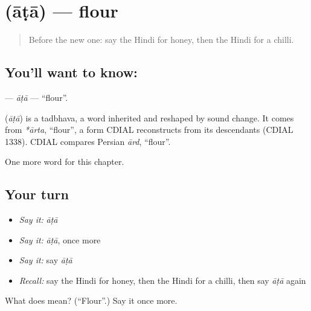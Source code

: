 \section[\texorpdfstring{\hi{आटा} (āṭā)}{आटा (āṭā)}]{ (āṭā) — flour}

\label{lesson:HI-C141-ata}



\begin{quote}
Before the new one: say the Hindi for honey, then the Hindi for a chilli.
\end{quote}

\subsection*{You'll want to know: }
\textbf{} — \emph{āṭā} — \textquotedblleft{}flour\textquotedblright{}.

\begin{cousinweb}
\textbf{} (\emph{āṭā}) is a tadbhava, a word inherited and reshaped by sound change. It comes from \emph{*ārta}, \textquotedblleft{}flour\textquotedblright{}, a form CDIAL reconstructs from its descendants (CDIAL 1338). CDIAL compares Persian \emph{ārd}, \textquotedblleft{}flour\textquotedblright{}.
\end{cousinweb}

\begin{grammarlens}[title={What you've built}]
One more word for this chapter.
\end{grammarlens}

\subsection*{Your turn}
\begin{itemize}
\raggedright
  \item \emph{Say it:} \emph{āṭā}
  \item \emph{Say it:} \emph{āṭā}, once more
  \item \emph{Say it:} say \emph{āṭā}
  \item \emph{Recall:} say the Hindi for honey, then the Hindi for a chilli, then say \emph{āṭā} again
\end{itemize}

\begin{tcolorbox}[breakable,colback=teal!4,colframe=teal!35!black,title={Before you move on}]
What does  mean? (\textquotedblleft{}Flour\textquotedblright{}.) Say it once more.
\end{tcolorbox}
